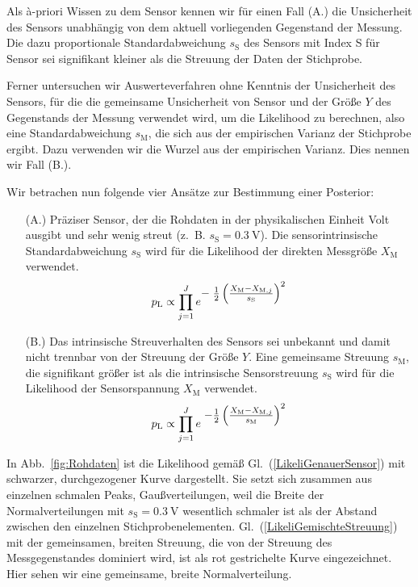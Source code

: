 Als {\`a}-priori Wissen zu dem Sensor kennen wir für einen Fall (A.) die Unsicherheit des
Sensors unabhängig von dem aktuell vorliegenden Gegenstand der Messung. Die dazu
proportionale Standardabweichung $s_\mathrm{S}$ des Sensors mit Index S für Sensor sei
signifikant kleiner als die Streuung der Daten der Stichprobe.

Ferner untersuchen wir Auswerteverfahren ohne Kenntnis der Unsicherheit des Sensors, für die
die gemeinsame Unsicherheit von Sensor und der Größe $Y$ des Gegenstands der Messung verwendet
wird, um die Likelihood zu berechnen, also eine Standardabweichung $s_\mathrm{M}$, die sich aus
der empirischen Varianz der Stichprobe ergibt. Dazu verwenden wir die Wurzel aus der empirischen
Varianz. Dies nennen wir Fall (B.).

Wir betrachen nun folgende vier Ansätze zur Bestimmung einer Posterior:

\begin{itemize}
	\item[(A.)] Präziser Sensor, 
	der die Rohdaten in der physikalischen Einheit Volt ausgibt und sehr wenig streut
	(z.~B. $s_\mathrm{S} = 0.3~\mathrm{V}$). Die sensorintrinsische Standardabweichung
	$s_\mathrm{S}$ wird für die Likelihood der direkten Messgröße $X_\mathrm{M}$ verwendet.
\begin{equation}
p_\mathrm{L} \propto \prod\limits_{j=1}^J 
e^{\textstyle -\;\frac{1}{2} \left(\frac{ X_\mathrm{M} - X_{\mathrm{M},j} }{s_\mathrm{S}} \right)^2}
\label{LikeliGenauerSensor}
\end{equation}
	\item[(B.)] Das intrinsische Streuverhalten des Sensors sei unbekannt und damit nicht
	trennbar von der Streuung der Größe $Y$. Eine gemeinsame Streuung $s_\mathrm{M}$, die signifikant
	größer ist als die intrinsische Sensorstreuung $s_\mathrm{S}$ wird für die Likelihood der
	Sensorspannung $X_\mathrm{M}$ verwendet.
\begin{equation}
p_\mathrm{L} \propto \prod\limits_{j=1}^J 
e^{\textstyle \; -\frac{1}{2} \left(\frac{X_\mathrm{M} - X_{\mathrm{M},j}}{s_\mathrm{M}} \right)^2}
\label{LikeliGemischteStreuung}
\end{equation}
\end{itemize}
In Abb.~\ref{fig:Rohdaten} ist die Likelihood gemäß Gl.~(\ref{LikeliGenauerSensor})
mit schwarzer, durchgezogener Kurve dargestellt. Sie setzt sich zusammen aus einzelnen
schmalen Peaks, Gaußverteilungen, weil die Breite der Normalverteilungen mit
$s_\mathrm{S} = 0.3~\mathrm{V}$ wesentlich schmaler ist als der Abstand zwischen den
einzelnen Stichprobenelementen. Gl.~(\ref{LikeliGemischteStreuung}) mit der gemeinsamen, breiten
Streuung, die von der Streuung des Messgegenstandes dominiert wird, ist als rot gestrichelte
Kurve eingezeichnet. Hier sehen wir eine gemeinsame, breite Normalverteilung.

